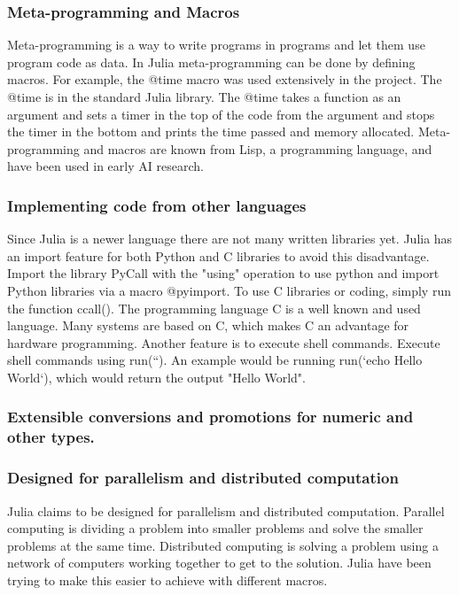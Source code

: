 \documentclass[a4paper, 11pt, titlepage]{article}
\begin{document}
\subsubsection{Meta-programming and Macros}
Meta-programming is a way to write programs in programs and let them use program code as data. In Julia meta-programming can be done by defining macros. For example, the @time macro was used extensively in the project. The @time is in the standard Julia library. The @time takes a function as an argument and sets a timer in the top of the code from the argument and stops the timer in the bottom and prints the time passed and memory allocated. Meta-programming and macros are known from Lisp, a programming language, and have been used in early AI research. 

\subsubsection{Implementing code from other languages}
Since Julia is a newer language there are not many written libraries yet. Julia has an import feature for both Python and C libraries to avoid this disadvantage. Import the library PyCall with the "using" operation to use python and import Python libraries via a macro @pyimport. To use C libraries or coding, simply run the function ccall(). The programming language C is a well known and used language. Many systems are based on C, which makes C an advantage for hardware programming. Another feature is to execute shell commands. Execute shell commands using run(``). An example would be running run(`echo Hello World`), which would return the output "Hello World".

\subsubsection{Extensible conversions and promotions for numeric and other types.}


\subsubsection{Designed for parallelism and distributed computation}
Julia claims to be designed for parallelism and distributed computation. Parallel computing is dividing a problem into smaller problems and solve the smaller problems at the same time. Distributed computing is solving a problem using a network of computers working together to get to the solution. Julia have been trying to make this easier to achieve with different macros.
\end{document}
